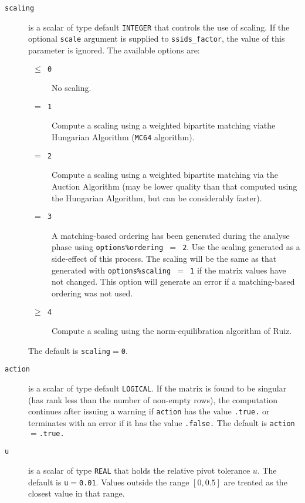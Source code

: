 \documentclass{spral}
\begin{document}
\begin{description}
\item[\texttt{scaling}] is a scalar of type default {\tt INTEGER} that controls
the use of scaling. If the optional {\tt scale} argument is supplied to
{\tt ssids\_factor}, the value of this parameter is ignored. The available
options are:
\begin{description}
   \item[\texttt{ $\le$ 0 }] No scaling.
   \item[\texttt{ $=$ 1 }] Compute a scaling using a weighted bipartite matching
      viathe Hungarian Algorithm (\texttt{MC64} algorithm).
   \item[\texttt{ $=$ 2 }] Compute a scaling using a weighted bipartite matching
      via the Auction Algorithm (may be lower quality than that computed using 
      the Hungarian Algorithm, but can be considerably faster).
   \item[\texttt{ $=$ 3 }] A matching-based ordering has been generated during the
      analyse phase using {\tt options\%ordering $=$ 2}. Use the
      scaling generated as a side-effect of this process. The scaling will be
      the same as that generated with {\tt options\%scaling $=$ 1} if the matrix
      values have not changed. This option will generate an error if a
      matching-based ordering was not used.
   \item[\texttt{ $\ge$ 4 }] Compute a scaling using the norm-equilibration
      algorithm of Ruiz.
\end{description}
The default is {\tt scaling}$=${\tt 0}.

\end{description}


\begin{description}
\item[\texttt{action}] is a scalar of type default {\tt LOGICAL}.
If the matrix is found to be singular (has rank less than the number of
non-empty rows), the computation continues after issuing a warning if
{\tt action} has the value {\tt .true.} or
terminates with an error if it has the value {\tt .false.}
The default is {\tt action}$=${\tt .true.}


\item[\texttt{u}] is a scalar of type {\tt REAL} that holds the relative pivot
tolerance $u$.
The default is {\tt u}$=${\tt 0.01}.
Values outside the range $[0,0.5]$ are treated as the closest value in that range.

\end{description}
\end{document}
